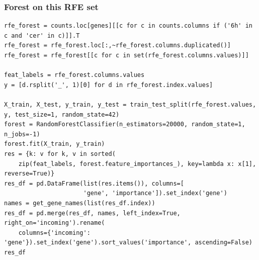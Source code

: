 \documentclass[11pt]{article}
\begin{document}
\subsubsection{Forest on this RFE set}
\label{sec:org28064f8}

\begin{verbatim}
rfe_forest = counts.loc[genes][[c for c in counts.columns if ('6h' in c and 'cer' in c)]].T
rfe_forest = rfe_forest.loc[:,~rfe_forest.columns.duplicated()]
rfe_forest = rfe_forest[[c for c in set(rfe_forest.columns.values)]]

feat_labels = rfe_forest.columns.values
y = [d.rsplit('_', 1)[0] for d in rfe_forest.index.values]

X_train, X_test, y_train, y_test = train_test_split(rfe_forest.values, y, test_size=1, random_state=42)
forest = RandomForestClassifier(n_estimators=20000, random_state=1, n_jobs=-1)
forest.fit(X_train, y_train)
res = {k: v for k, v in sorted(
    zip(feat_labels, forest.feature_importances_), key=lambda x: x[1], reverse=True)}
res_df = pd.DataFrame(list(res.items()), columns=[
                      'gene', 'importance']).set_index('gene')
names = get_gene_names(list(res_df.index))
res_df = pd.merge(res_df, names, left_index=True, right_on='incoming').rename(
    columns={'incoming': 'gene'}).set_index('gene').sort_values('importance', ascending=False)
res_df
\end{verbatim}
\end{document}
